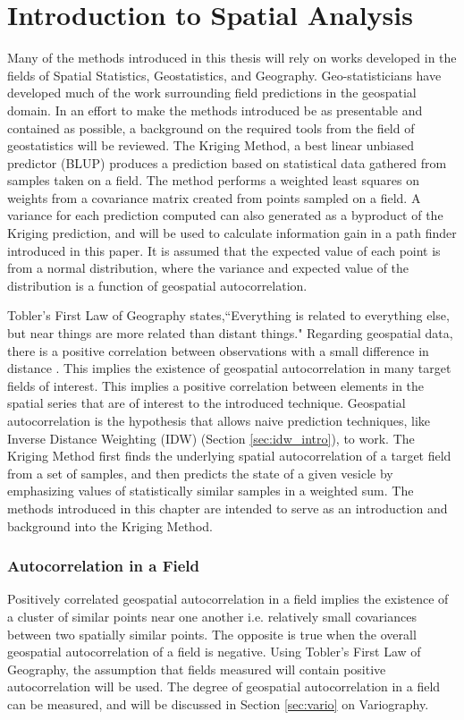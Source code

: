 \chapter{Introduction to Spatial Analysis}
Many of the methods introduced in this thesis will rely on works developed in the fields of Spatial Statistics, Geostatistics, and Geography. Geo-statisticians have developed much of the work surrounding field predictions in the geospatial domain. In an effort to make the methods introduced be as presentable and contained as possible, a background on the required tools from the field of geostatistics will be reviewed. The Kriging Method, a best linear unbiased predictor (BLUP) produces a prediction based on statistical data gathered from samples taken on a field. The method performs a weighted least squares on weights from a covariance matrix created from points sampled on a field. A variance for each prediction computed can also generated as a byproduct of the Kriging prediction, and will be used to calculate information gain in a path finder introduced in this paper. It is assumed that the expected value of each point is from a normal distribution, where the variance and expected value of the distribution is a function of geospatial autocorrelation.

Tobler's First Law of Geography \cite{tobler:first_law} states,``Everything is related to everything else, but near things are more related than distant things." Regarding geospatial data, there is a positive correlation between observations with a small difference in distance \cite{miller:on_toblers_first_law}. This implies the existence of geospatial autocorrelation in many target fields of interest. This implies a positive correlation between elements in the spatial series that are of interest to the introduced technique. Geospatial autocorrelation is the hypothesis that allows naive prediction techniques, like Inverse Distance Weighting (IDW) (Section \ref{sec:idw_intro}), to work. The Kriging Method first finds the underlying spatial autocorrelation of a target field from a set of samples, and then predicts the state of a given vesicle by emphasizing values of statistically similar samples in a weighted sum. The methods introduced in this chapter are intended to serve as an introduction and background into the Kriging Method.

\subsection{Autocorrelation in a Field}
Positively correlated geospatial autocorrelation in a field implies the existence of a cluster of similar points near one another i.e. relatively small covariances between two spatially similar points. The opposite is true when the overall geospatial autocorrelation of a field is negative. Using Tobler's First Law of Geography, the assumption that fields measured will contain positive autocorrelation will be used. The degree of geospatial autocorrelation in a field can be measured, and will be discussed in Section \ref{sec:vario} on Variography.

